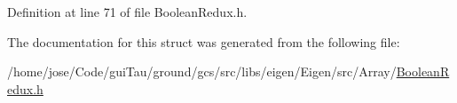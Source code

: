 Definition at line 71 of file Boolean\-Redux.\-h.



The documentation for this struct was generated from the following file\-:\begin{DoxyCompactItemize}
\item 
/home/jose/\-Code/gui\-Tau/ground/gcs/src/libs/eigen/\-Eigen/src/\-Array/\hyperlink{_boolean_redux_8h}{Boolean\-Redux.\-h}\end{DoxyCompactItemize}
